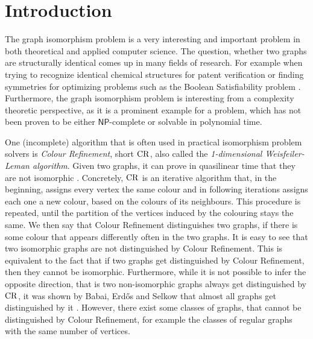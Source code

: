 \section{Introduction}

The graph isomorphism problem is a very interesting and important problem in both theoretical and applied computer science.
The question, whether two graphs are structurally identical comes up in many fields of research.
For example when trying to recognize identical chemical structures for patent verification \cite{ray1957FindingChemical} or finding symmetries for optimizing problems such as the Boolean Satisfiability problem \cite{grohe2020GraphIsomorphism}.
Furthermore, the graph isomorphism problem is interesting from a complexity theoretic perspective, as it is a prominent example for a problem, which has not been proven to be either $\mathsf{NP}$-complete or solvable in polynomial time. \cite{babai2016GraphIsomorphism}

One (incomplete) algorithm that is often used in practical isomorphism problem solvers \cite{grohe2020GraphIsomorphism} is \emph{Colour Refinement}, short $\operatorname{CR}$, also called the \emph{1-dimensional Weisfeiler-Leman algorithm}.
Given two graphs, it can prove in quasilinear time that they are not isomorphic \cite{berkholz2017TightLowera}.
Concretely, $\operatorname{CR}$ is an iterative algorithm that, in the beginning, assigns every vertex the same colour and in following iterations assigns each one a new colour, based on the colours of its neighbours.
This procedure is repeated, until the partition of the vertices induced by the colouring stays the same. 
We then say that Colour Refinement distinguishes two graphs, if there is some colour that appears differently often in the two graphs.
It is easy to see that two isomorphic graphs are not distinguished by Colour Refinement.
This is equivalent to the fact that if two graphs get distinguished by Colour Refinement, then they cannot be isomorphic.
Furthermore, while it is not possible to infer the opposite direction, that is two non-isomorphic graphs always get distinguished by $\operatorname{CR}$, it was shown by Babai, Erd\H{o}s and Selkow that almost all graphs get distinguished by it \cite{babai1980RandomGraph}.
However, there exist some classes of graphs, that cannot be distinguished by Colour Refinement, for example the classes of regular graphs with the same number of vertices.

